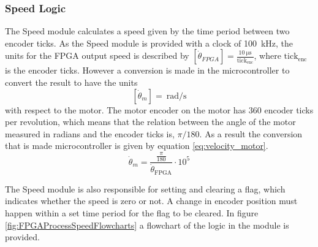 \documentclass[../../main.tex]{subfiles}
\begin{document}
\subsubsection*{Speed Logic}
The Speed module calculates a speed given by the time period between two encoder ticks. As the Speed module is provided with a clock of \SI{100}{\kilo \hertz}, the units for the FPGA output speed is described by $\left[\dot{\theta}_{FPGA}\right] = \frac{\SI{10}{\micro \second}}{\mathrm{tick_{enc}}}$, where $\mathrm{tick_{enc}}$ is the encoder ticks. However a conversion is made in the microcontroller to convert the result to have the units \[ \left[ \dot{\theta}_m \right] = \SI{}{\radian \per \second } \] with respect to the motor. The motor encoder on the motor has 360 encoder ticks per revolution, which means that the relation between the angle of the motor measured in radians and the encoder ticks is, $\pi / 180$. As a result the conversion that is made microcontroller is given by equation \ref{eq:velocity_motor}.
\begin{equation}\label{eq:velocity_motor}
    \dot{\theta}_{m} = \frac{\frac{\pi}{180}}{ \dot{\theta}_{\mathrm{FPGA}} }\cdot 10^{5}
\end{equation}

The Speed module is also responsible for setting and clearing a flag, which indicates whether the speed is zero or not. A change in encoder position must happen within a set time period for the flag to be cleared. In figure \ref{fig:FPGAProcessSpeedFlowcharts} a flowchart of the logic in the module is provided.
\end{document}
